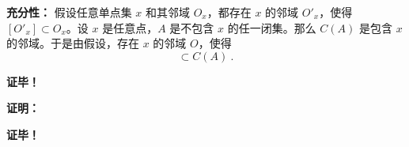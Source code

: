 \textbf{充分性：} 假设任意单点集 $x$ 和其邻域 $O_x$，都存在 $x$ 的邻域 $ O'_x$，使得 $[O'_x]\subset O_x$。设 $x$ 是任意点，$A$ 是不包含 $x$ 的任一闭集。那么 $C(A)$ 是包含 $x$ 的邻域。于是由假设，存在 $x$ 的邻域 $O$，使得 
\begin{equation}
[O]\subset C(A)~.
\end{equation}

\textbf{证毕！}









\textbf{证明：}


\textbf{证毕！}




